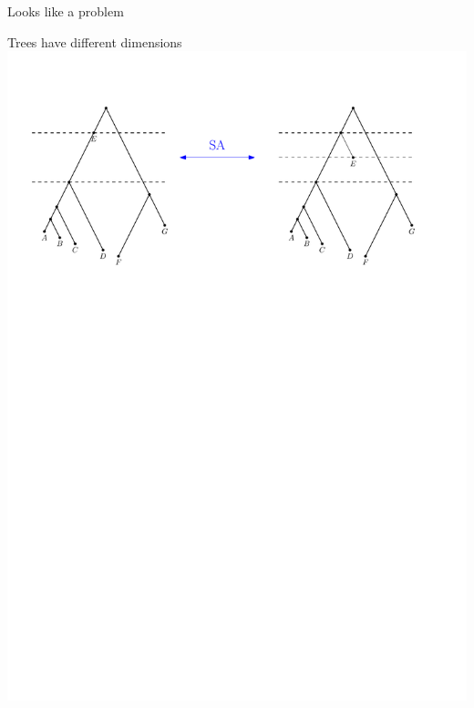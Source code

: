 \documentclass{beamer}
\begin{document}
\begin{frame}{Looks like a problem}
\begin{block}{Trees have different dimensions}
\includegraphics[width=\framewidth]{SAT_dimension}
\end{block}
\end{frame}
\end{document}

